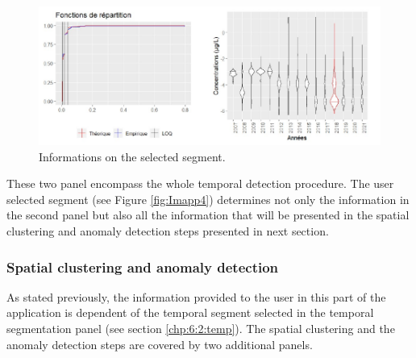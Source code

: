 \begin{figure}[htbp]
  \centering
  \includegraphics[]{figs/Chap6/Im_appbis5.pdf}
  \caption{Informations on the selected segment.}
  \label{fig:Imapp5}
\end{figure}

These two panel encompass the whole temporal detection procedure. The user selected segment (see Figure \ref{fig:Imapp4}) determines not only the information in the second panel but also all the information that will be presented in the spatial clustering and anomaly detection steps presented in next section.


\subsubsection{Spatial clustering and anomaly detection}\label{chp:6:2:spat}


As stated previously, the information provided to the user in this part of the application is dependent of the temporal segment selected in the temporal segmentation panel (see section \ref{chp:6:2:temp}). The spatial clustering and the anomaly detection steps are covered by two additional panels. 

